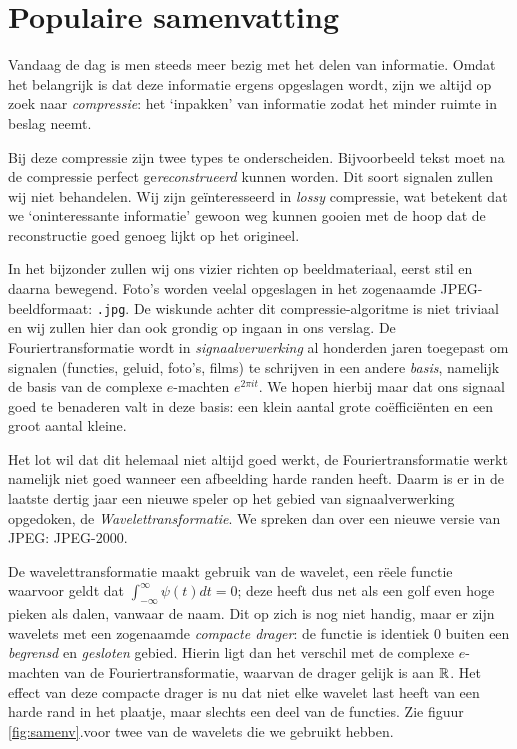\chapter{Populaire samenvatting}

\vspace{-3pt}
Vandaag de dag is men steeds meer bezig met het delen van informatie. Omdat het belangrijk is dat deze informatie ergens opgeslagen wordt, zijn we altijd op zoek naar \emph{compressie}: het `inpakken' van informatie zodat het minder ruimte in beslag neemt.

Bij deze compressie zijn twee types te onderscheiden. Bijvoorbeeld tekst moet na de compressie perfect ge\emph{reconstrueerd} kunnen worden. Dit soort signalen zullen wij niet behandelen. Wij zijn ge\"interesseerd in \emph{lossy} compressie, wat betekent dat we `oninteressante informatie' gewoon weg kunnen gooien met de hoop dat de reconstructie goed genoeg lijkt op het origineel.

In het bijzonder zullen wij ons vizier richten op beeldmateriaal, eerst stil en daarna bewegend. Foto's worden veelal opgeslagen in het zogenaamde JPEG-beeldformaat: \texttt{.jpg}. De wiskunde achter dit compressie-algoritme is niet triviaal en wij zullen hier dan ook grondig op ingaan in ons verslag. De Fouriertransformatie wordt in \emph{signaalverwerking} al honderden jaren toegepast om signalen (functies, geluid, foto's, films) te schrijven in een andere \emph{basis}, namelijk de basis van de complexe $e$-machten $e^{2 \pi i t}$. We hopen hierbij maar dat ons signaal goed te benaderen valt in deze basis: een klein aantal grote co\"effici\"enten en een groot aantal kleine.

Het lot wil dat dit helemaal niet altijd goed werkt, de Fouriertransformatie werkt namelijk niet goed wanneer een afbeelding harde randen heeft.
Daarm is er in de laatste dertig jaar een nieuwe speler op het gebied van signaalverwerking opgedoken, de \mbox{\emph{Wavelettransformatie}}. 
We spreken dan over een nieuwe versie van JPEG: JPEG-2000.

De wavelettransformatie maakt gebruik van de wavelet, een r\"eele functie waarvoor geldt dat $\int_{-\infty}^\infty \psi(t) dt = 0$;
deze heeft dus net als een golf even hoge pieken als dalen, vanwaar de naam.
Dit op zich is nog niet handig, maar er zijn wavelets met een zogenaamde \emph{compacte drager}:
de functie is identiek $0$ buiten een \emph{begrensd} en \emph{gesloten} gebied. 
Hierin ligt dan het verschil met de complexe $e$-machten van de Fouriertransformatie, waarvan de drager gelijk is aan $\mathbb{R}$. 
Het effect van deze compacte drager is nu dat niet elke wavelet last heeft van een harde rand in het plaatje, maar slechts een deel van de functies.
Zie figuur \ref{fig:samenv}.voor twee van de wavelets die we gebruikt hebben.


